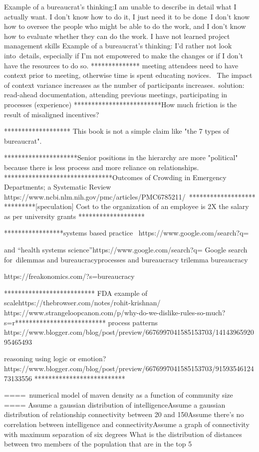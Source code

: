 Example of a bureaucrat's thinking:I am unable to describe in detail what I actually want. I don't know how to do it, I just need it to be done I don't know how to oversee the people who might be able to do the work, and I don't know how to evaluate whether they can do the work. I have not learned project management skills
Example of a bureaucrat's thinking:
I'd rather not look into details, especially if I'm not empowered to make the changes or if I don't have the resources to do so.
**************
meeting attendees need to have context prior to meeting, otherwise time is spent educating novices. 
The impact of context variance increases as the number of participants increases. solution: read-ahead documentation, attending previous meetings, participating in processes (experience)
*************************How much friction is the result of misaligned incentives?

*******************
This book is not a simple claim like "the 7 types of bureaucrat". 

*********************Senior positions in the hierarchy are more "political" because there is less process and more reliance on relationships.
*******************************Outcomes of Crowding in Emergency Departments; a Systematic Review
https://www.ncbi.nlm.nih.gov/pmc/articles/PMC6785211/ ****************************[speculation] Cost to the organization of an employee is 2X the salary as per university grants
*******************

*****************systems based practice 
https://www.google.com/search?q=%

and “health systems science”https://www.google.com/search?q=%
Google search for dilemmas and bureaucracyprocesses and bureaucracy
trilemma bureaucracy

https://freakonomics.com/?s=bureaucracy

**************************
FDA example of scalehttps://thebrowser.com/notes/rohit-krishnan/
https://www.strangeloopcanon.com/p/why-do-we-dislike-rules-so-much?s=r**************************
process patterns
https://www.blogger.com/blog/post/preview/6676997041585153703/1414396592095465493

reasoning using logic or emotion?
https://www.blogger.com/blog/post/preview/6676997041585153703/9159354612473133556
**************************

==== numerical model of maven density as a function of community size ====
Assume a gaussian distribution of intelligenceAssume a gaussian distribution of relationship connectivity between 20 and 150Assume there's no correlation between intelligence and connectivityAssume a graph of connectivity with maximum separation of six degrees
What is the distribution of distances between two members of the population that are in the top 5%


